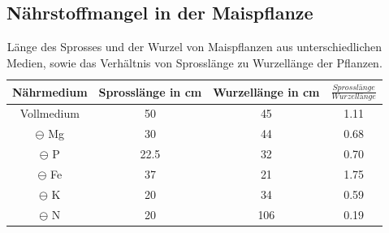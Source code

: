 \documentclass[10pt,a4paper]{article}
\begin{document}
		\subsection{Nährstoffmangel in der Maispflanze}
		
		\begin{table}[H]
			\centering
			\caption{Länge des Sprosses und der Wurzel von Maispflanzen aus unterschiedlichen Medien, sowie das Verhältnis von Sprosslänge zu Wurzellänge der Pflanzen.}
			\label{tab:Verhältnis}
			\begin{tabular}{cccc}
				\toprule
				Nährmedium & Sprosslänge in cm & Wurzellänge in cm & $\frac{Sprosslänge}{Wurzellänge}$\\
				\midrule
				Vollmedium & 50 & 45 & 1.11\\
				$\ominus$ Mg & 30 & 44 & 0.68\\
				$\ominus$ P & 22.5 & 32 & 0.70\\
				$\ominus$ Fe & 37 & 21 & 1.75 \\
				$\ominus$ K & 20 & 34 & 0.59\\
				$\ominus$ N & 20 & 106 & 0.19\\
				\bottomrule
			\end{tabular}
		\end{table}	
		
		
		
\end{document}
